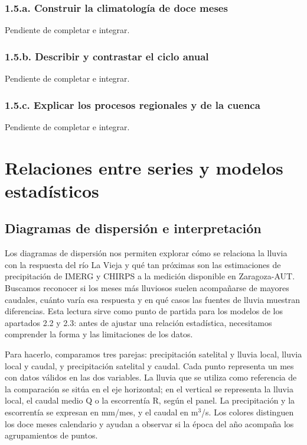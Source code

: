 \documentclass[10pt,a4paper]{article}
\begin{document}
\subsubsection*{1.5.a. Construir la climatología de doce meses}
Pendiente de completar e integrar.
\subsubsection*{1.5.b. Describir y contrastar el ciclo anual}
Pendiente de completar e integrar.
\subsubsection*{1.5.c. Explicar los procesos regionales y de la cuenca}
Pendiente de completar e integrar.
\clearpage
\section{Relaciones entre series y modelos estadísticos}
\setcounter{equation}{0}

\subsection{Diagramas de dispersión e interpretación}
Los diagramas de dispersión nos permiten explorar cómo se relaciona la lluvia con la respuesta del río La Vieja y qué tan próximas son las estimaciones de precipitación de IMERG y CHIRPS a la medición disponible en Zaragoza-AUT. Buscamos reconocer si los meses más lluviosos suelen acompañarse de mayores caudales, cuánto varía esa respuesta y en qué casos las fuentes de lluvia muestran diferencias. Esta lectura sirve como punto de partida para los modelos de los apartados 2.2 y 2.3: antes de ajustar una relación estadística, necesitamos comprender la forma y las limitaciones de los datos.

Para hacerlo, comparamos tres parejas: precipitación satelital y lluvia local, lluvia local y caudal, y precipitación satelital y caudal. Cada punto representa un mes con datos válidos en las dos variables. La lluvia que se utiliza como referencia de la comparación se sitúa en el eje horizontal; en el vertical se representa la lluvia local, el caudal medio Q o la escorrentía R, según el panel. La precipitación y la escorrentía se expresan en mm/mes, y el caudal en m$^3$/s. Los colores distinguen los doce meses calendario y ayudan a observar si la época del año acompaña los agrupamientos de puntos.
\end{document}
